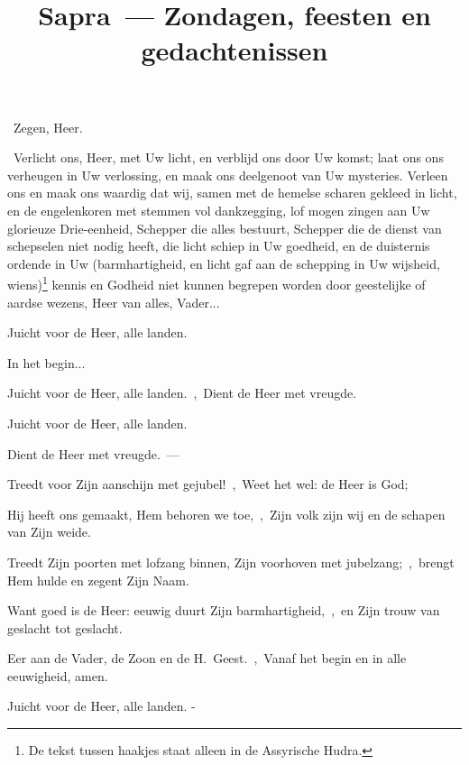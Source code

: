 \documentclass[12pt,twoside,a5paper]{article}
\begin{document}
\title{Sapra~--- Zondagen, feesten en gedachtenissen}
\author{}
\date{}
\maketitle


\begin{halfparskip}
\dd~Zegen, Heer.

\cc~Verlicht ons, Heer, met Uw licht, en verblijd ons door Uw komst; laat ons ons verheugen in Uw verlossing, en maak ons deelgenoot van Uw mysteries. Verleen ons en maak ons waardig dat wij, samen met de hemelse scharen gekleed in licht, en de engelenkoren met stemmen vol dankzegging, lof mogen zingen aan Uw glorieuze Drie-eenheid, Schepper die alles bestuurt, Schepper die de dienst van schepselen niet nodig heeft, die licht schiep in Uw goedheid, en de duisternis ordende in Uw (barmhartigheid, en licht gaf aan de schepping in Uw wijsheid, wiens)\footnote{De tekst tussen haakjes staat alleen in de Assyrische Hudra.} kennis en Godheid niet kunnen begrepen worden door geestelijke of aardse wezens, Heer van alles, Vader... 
\end{halfparskip}


\begin{halfparskip}
   Juicht voor de Heer, alle landen.

    In het begin...

  Juicht voor de Heer, alle landen.~\sep\ Dient de Heer met vreugde.

  \fullline
   

  Juicht voor de Heer, alle landen.

  Dient de Heer met vreugde.~--- 

  \fullline
   Treedt voor Zijn aanschijn met gejubel!~\sep\ Weet het wel: de Heer is God;

  Hij heeft ons gemaakt, Hem behoren we toe,~\sep\ Zijn volk zijn wij en de schapen van Zijn weide.

  Treedt Zijn poorten met lofzang binnen, Zijn voorhoven met jubelzang;~\sep\ brengt Hem hulde en zegent Zijn Naam.

  Want goed is de Heer: eeuwig duurt Zijn barmhartigheid,~\sep\ en Zijn trouw van geslacht tot geslacht.

  Eer aan de Vader, de Zoon en de H.~Geest.~\sep\ Vanaf het begin en in alle eeuwigheid, amen.

  Juicht voor de Heer, alle landen. - 
\end{halfparskip}
\end{document}

